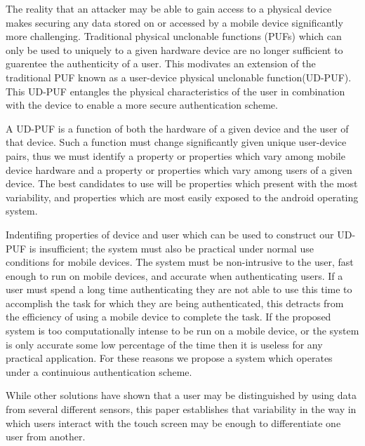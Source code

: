\documentclass{acm_proc_article-sp}
\begin{document}
The reality that an attacker may be able to gain access to a physical device makes securing any data stored on or accessed by a mobile device significantly more challenging. Traditional physical unclonable functions (PUFs) which can only be used to uniquely to a given hardware device are no longer sufficient to guarentee the authenticity of a user.
%
This modivates an extension of the traditional PUF known as a user-device physical unclonable function(UD-PUF). This UD-PUF entangles the physical characteristics of the user in combination with the device to enable a more secure authentication scheme.

A UD-PUF is a function of both the hardware of a given device and the user of that device. Such a function must change significantly given unique user-device pairs, thus we must identify a property or properties which vary among mobile device hardware and a property or properties which vary among users of a given device. The best candidates to use will be properties which present with the most variability, and properties which are most easily exposed to the android operating system.

Indentifing properties of device and user which can be used to construct our UD-PUF is insufficient; the system must also be practical under normal use conditions for mobile devices. The system must be non-intrusive to the user, fast enough to run on mobile devices, and accurate when authenticating users. If a user must spend a long time authenticating they are not able to use this time to accomplish the task for which they are being authenticated, this detracts from the efficiency of using a mobile device to complete the task. If the proposed system is too computationally intense to be run on a mobile device, or the system is only accurate some low percentage of the time then it is useless for any practical application. For these reasons we propose a system which operates under a continuious authentication scheme.

While other solutions have shown that a user may be distinguished by using data from several different sensors, this paper establishes that variability in the way in which users interact with the touch screen may be enough to differentiate one user from another. %
\end{document}
